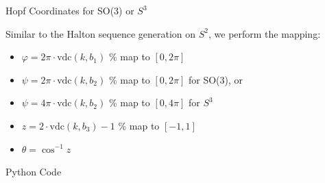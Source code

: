 \begin{frame}{Hopf Coordinates for SO(3) or \(S^3\)}
\protect\hypertarget{hopf-coordinates-for-so3-or-s3}{}

Similar to the Halton sequence generation on \(S^2\), we perform the
mapping:

\begin{itemize}
\item
  \(\varphi = 2\pi\cdot\mathrm{vdc}(k,b_1)\) \% map to \([0,2\pi]\)
\item
  \(\psi = 2\pi\cdot\mathrm{vdc}(k,b_2)\) \% map to \([0,2\pi]\) for
  SO(3), or
\item
  \(\psi = 4\pi\cdot\mathrm{vdc}(k,b_2)\) \% map to \([0,4\pi]\) for
  \(S^3\)
\item
  \(z = 2\cdot\mathrm{vdc}(k,b_3) - 1\) \% map to \([-1,1]\)
\item
  \(\theta = \cos^{-1}z\)
\end{itemize}

\end{frame}

\begin{frame}[fragile]{Python Code}
\protect\hypertarget{python-code-1}{}

\begin{Shaded}
\begin{Highlighting}[]
\OperatorTok{=} \NormalTok{(vdc(k, b[}\NormalTok{]), vdc(k, b[}\NormalTok{]), vdc(k, b[}\NormalTok{]))}
\OperatorTok{=} \OperatorTok{*}\OperatorTok{*}
\OperatorTok{=} \OperatorTok{*}\OperatorTok{*}
\OperatorTok{=} \OperatorTok{*}\OperatorTok{-}          
\OperatorTok{=}
\OperatorTok{=}\OperatorTok{/}\NormalTok{)}
\OperatorTok{=}\OperatorTok{/}\NormalTok{)}
\OperatorTok{=}\NormalTok{ [cos_eta }\OperatorTok{*}\OperatorTok{/}\NormalTok{),}
\OperatorTok{*}\OperatorTok{/}\NormalTok{),}
\OperatorTok{*}\OperatorTok{+}\OperatorTok{/}\NormalTok{),}
\OperatorTok{*}\OperatorTok{+}\OperatorTok{/}\NormalTok{)]}
\end{Highlighting}
\end{Shaded}

\end{frame}


